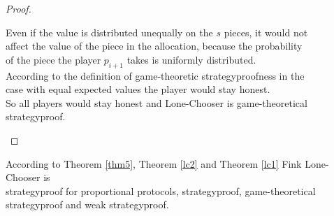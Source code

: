 \begin{proof}
\begin{itemize}
\begin{itemize}
Even if the value is distributed unequally on the $s$ pieces, it would not\\affect the value of the piece in the allocation, because the probability\\of the piece the player $p_{i+1}$ takes is uniformly distributed.\\
According to the definition of game-theoretic strategyproofness in the\\case with equal expected values the player would stay honest.\\So all players would stay honest and Lone-Chooser is game-theoretical\\strategyproof.
\end{itemize}
\end{itemize}
\end{proof}
\begin{bezeichnungen}
According to Theorem \ref{thm5}, Theorem \ref{lc2} and Theorem \ref{lc1} Fink Lone-Chooser is\\strategyproof for proportional protocols, strategyproof, game-theoretical strategyproof and weak strategyproof.
\end{bezeichnungen}
\newpage

